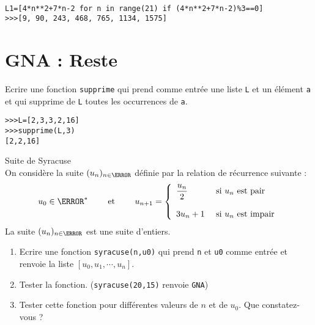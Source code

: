 \begin{solution}~\\
\vspace{-0.7cm}
\begin{verbatim}
L1=[4*n**2+7*n-2 for n in range(21) if (4*n**2+7*n-2)%3==0]
>>>[9, 90, 243, 468, 765, 1134, 1575]
\end{verbatim}
\end{solution}
















\section{GNA : Reste}


\begin{exercice}
Ecrire une fonction \verb?supprime? qui prend comme entr\' ee une liste \verb?L? et un \' el\' ement \verb?a? et qui supprime de \verb?L? toutes les occurrences de \verb?a?.
\begin{verbatim}
>>>L=[2,3,3,2,16]
>>>supprime(L,3)
[2,2,16]
\end{verbatim}
\end{exercice}



\begin{exercice}Suite de Syracuse\\
On consid\` ere la suite $(u_n)_{n\in\N}$ d\' efinie par la relation de r\' ecurrence suivante :
\[u_0\in\N^*\qquad \text{ et }\qquad u_{n+1}=\left\lbrace\begin{array}{lll}
\dfrac{u_n}{2}&\text{ si } u_n \text{ est pair} \bigskip \\
3u_n+1&\text{ si } u_n \text{ est impair}
\end{array}\right.\]
La suite $(u_n)_{n\in\N}$ est une suite d'entiers. 
\begin{enumerate}
\item Ecrire une fonction \verb?syracuse(n,u0)? qui prend \verb?n? et \verb?u0? comme entr\' ee et renvoie la liste $[u_0,u_1,\cdots,u_n]$.
\item Tester la fonction. (\verb?syracuse(20,15)? renvoie \verb?GNA?)
\item Tester cette fonction pour diff\' erentes valeurs de $n$ et de $u_0$. Que constatez-vous ? 
\end{enumerate}
\end{exercice}






